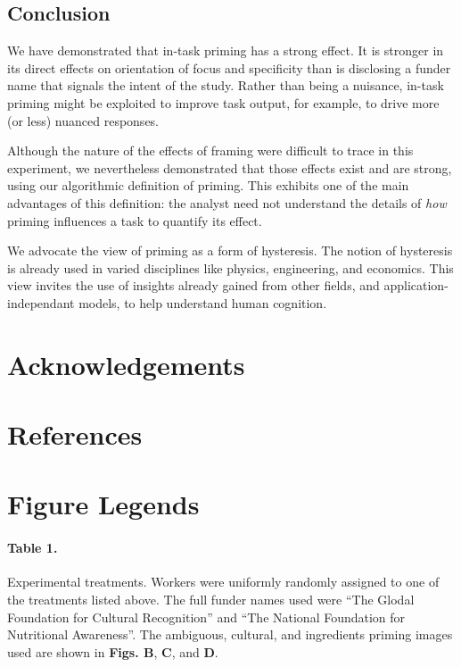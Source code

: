 \documentclass[a4paper]{report}
\begin{document}
\subsection*{Conclusion}
We have demonstrated that in-task priming has a strong effect.  It is stronger
in its direct effects on orientation of focus and specificity than is 
disclosing a funder name that signals the intent of the study.  
Rather than being a nuisance, in-task priming might be exploited to improve
task output, for example, to drive more (or less) nuanced responses.

Although the nature of the effects of framing were difficult to trace
in this experiment, we nevertheless demonstrated that those effects exist
and are strong, using our algorithmic definition of priming.  This exhibits
one of the main advantages of this definition: the analyst need 
not understand the details of \textit{how} priming influences a task to 
quantify its effect.

We advocate the view of priming as a form of hysteresis.  The notion of 
hysteresis is already used in varied disciplines like physics, engineering,
and economics.  This view invites the use of insights already gained from 
other fields, and application-independant models, to help understand human 
cognition.

\section*{Acknowledgements}
\section*{References}
\begingroup
\renewcommand{\chapter}[2]{}

\endgroup
 

\section*{Figure Legends}

\paragraph{Table 1.}
	Experimental treatments.  Workers were uniformly randomly
	assigned to one of the treatments listed above.  The full funder 
	names used were ``The Glodal Foundation
	for Cultural Recognition'' and ``The National Foundation for 
	Nutritional Awareness''.  The ambiguous, cultural, and ingredients 
	priming images used are shown in \textbf{Figs. B}, \textbf{C}, and 
	\textbf{D}.
\end{document}

